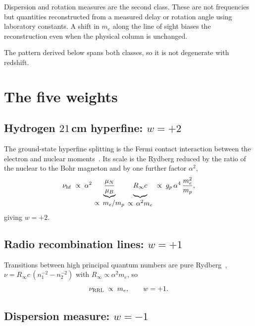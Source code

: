 \documentclass[aps,prd,twocolumn,superscriptaddress,nofootinbib,10pt]{revtex4-2}
\begin{document}
Dispersion and rotation measures are the second class. These are not frequencies but quantities
reconstructed from a measured delay or rotation angle using laboratory constants. A shift in $m_e$
along the line of sight biases the reconstruction even when the physical column is unchanged.

The pattern derived below spans both classes, so it is not degenerate with redshift.

\section{The five weights}\label{sec:weights}

\subsection{Hydrogen $21\,$cm hyperfine: $w = +2$}

The ground-state hyperfine splitting is the Fermi contact interaction between the electron and
nuclear moments~\cite{WolfeBrownRoberts1976,Tzanavaris2005}. Its scale is the Rydberg reduced by
the ratio of the nuclear to the Bohr
magneton and by one further factor $\alpha^2$,
%
\begin{equation}
  \nu_{\rm hf} \;\propto\; \alpha^{2}\,
  \underbrace{\frac{\mu_N}{\mu_B}}_{\textstyle \propto\, m_e/m_p}\;
  \underbrace{\vphantom{\frac{\mu_N}{\mu_B}} R_\infty c}_{\textstyle \propto\, \alpha^{2} m_e}
  \;\propto\; g_p\,\alpha^{4}\,\frac{m_e^{2}}{m_p},
  \label{eq:hf}
\end{equation}
%
giving $w = +2$.

\subsection{Radio recombination lines: $w = +1$}

Transitions between high principal quantum numbers are pure Rydberg~\cite{GordonSorochenko2009},
$\nu = R_\infty c\,(n_1^{-2}-n_2^{-2})$ with $R_\infty \propto \alpha^{2} m_e$, so
%
\begin{equation}
  \nu_{\rm RRL} \;\propto\; m_e, \qquad w = +1 .
\end{equation}

\subsection{Dispersion measure: $w = -1$}
\end{document}
